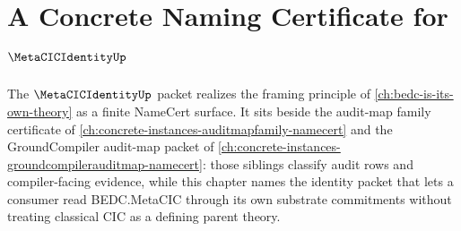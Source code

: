 \chapter{A Concrete Naming Certificate for $\MetaCICIdentityUp$}
\label{ch:concrete-instances-metacicidentity-namecert}

The $\MetaCICIdentityUp$ packet realizes the framing principle of \autoref{ch:bedc-is-its-own-theory} as a finite NameCert surface. It sits beside the audit-map family certificate of \autoref{ch:concrete-instances-auditmapfamily-namecert} and the GroundCompiler audit-map packet of \autoref{ch:concrete-instances-groundcompilerauditmap-namecert}: those siblings classify audit rows and compiler-facing evidence, while this chapter names the identity packet that lets a consumer read BEDC.MetaCIC through its own substrate commitments without treating classical CIC as a defining parent theory.


